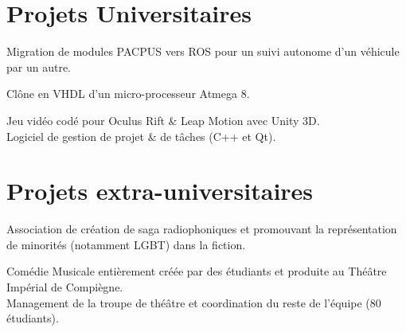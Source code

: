 \documentclass[]{cv-template}
\begin{document}
\begin{minipage}[t]{0.65\textwidth}


\section{Projets Universitaires}
Migration de modules PACPUS vers ROS pour un suivi autonome d'un véhicule par un autre.


Clône en VHDL d'un micro-processeur Atmega 8.




Jeu vidéo codé pour Oculus Rift \& Leap Motion avec Unity 3D. \\


Logiciel de gestion de projet \& de tâches (C++ et Qt).

\section{Projets extra-universitaires}
Association de création de saga radiophoniques et promouvant la représentation de minorités (notamment LGBT) dans la fiction.

Comédie Musicale entièrement créée par des étudiants et produite au Théâtre Impérial de Compiègne. \\
Management de la troupe de théâtre et coordination du reste de l'équipe (80 étudiants).


\sectionsep 

\end{minipage} 
\end{document}
